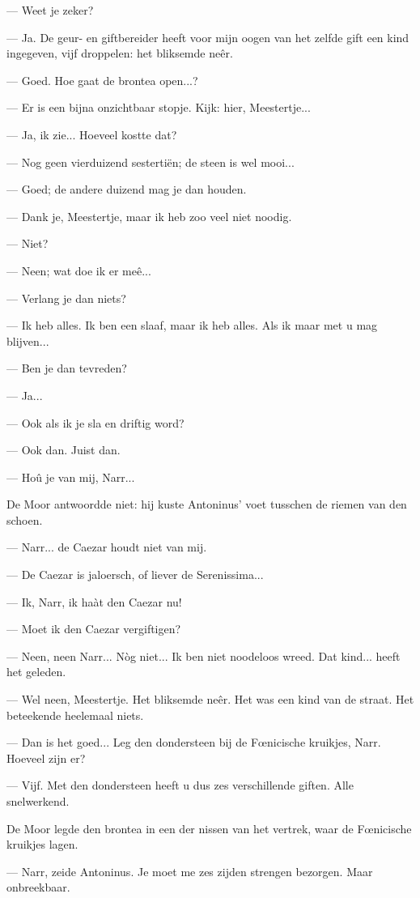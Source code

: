 \documentclass[a4paper, 12pt, oneside, dutch]{article}
\begin{document}
--- Weet je zeker?

--- Ja. De geur- en giftbereider heeft voor mijn oogen van het zelfde gift een kind ingegeven, vijf droppelen: het bliksemde neêr.

--- Goed. Hoe gaat de brontea open...?

--- Er is een bijna onzichtbaar stopje. Kijk: hier, Meestertje...

--- Ja, ik zie... Hoeveel kostte dat?

--- Nog geen vierduizend sestertiën; de steen is wel mooi...

--- Goed; de andere duizend mag je dan houden.

--- Dank je, Meestertje, maar ik heb zoo veel niet noodig.

--- Niet?

--- Neen; wat doe ik er meê...

--- Verlang je dan niets?

--- Ik heb alles. Ik ben een slaaf, maar ik heb alles. Als ik maar met u mag blijven...

--- Ben je dan tevreden?

--- Ja...

--- Ook als ik je sla en driftig word?

--- Ook dan. Juist dan.

--- Hoû je van mij, Narr...

De Moor antwoordde niet: hij kuste Antoninus' voet tusschen de riemen van den schoen.

--- Narr... de Caezar houdt niet van mij.

--- De Caezar is jaloersch, of liever de Serenissima...

--- Ik, Narr, ik haàt den Caezar nu!

--- Moet ik den Caezar vergiftigen?

--- Neen, neen Narr... Nòg niet... Ik ben niet noodeloos wreed. Dat kind... heeft het geleden.

--- Wel neen, Meestertje. Het bliksemde neêr. Het was een kind van de straat. Het beteekende heelemaal niets.

--- Dan is het goed... Leg den dondersteen bij de Fœnicische kruikjes, Narr. Hoeveel zijn er?

--- Vijf. Met den dondersteen heeft u dus zes verschillende giften. Alle snelwerkend.

De Moor legde den brontea in een der nissen van het vertrek, waar de Fœnicische kruikjes lagen.

--- Narr, zeide Antoninus. Je moet me zes zijden strengen bezorgen. Maar onbreekbaar.
\end{document}

